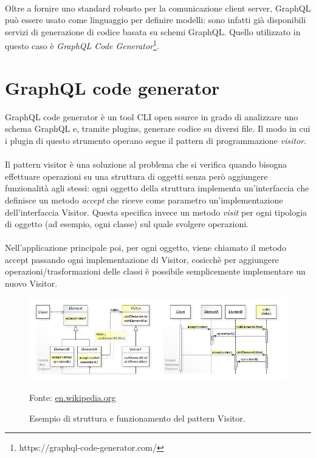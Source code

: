 \documentclass[a4paper, 12pt]{report}
\newcommand{\source}[1]{\caption*{Fonte: {#1}}}
\begin{document}
      \paragraph*{}
        Oltre a fornire uno standard robusto per la comunicazione client server, GraphQL può essere usato come linguaggio per definire modelli: sono infatti già disponibili servizi di generazione di codice basata su schemi GraphQL.
        Quello utilizzato in questo caso è \emph{GraphQL Code Generator}\footnote{https://graphql-code-generator.com/}.
      \newpage
    \section{GraphQL code generator}
        GraphQL code generator è un tool CLI open source in grado di analizzare uno schema GraphQL e, tramite plugins, generare codice su diversi file.
        Il modo in cui i plugin di questo strumento operano segue il pattern di programmazione \emph{visitor}.
      \paragraph*{}
        Il pattern visitor è una soluzione al problema che si verifica quando bisogna effettuare operazioni su una struttura di oggetti senza però aggiungere funzionalità agli stessi:
        ogni oggetto della struttura implementa un'interfaccia che definisce un metodo \emph{accept} che riceve come parametro un'implementazione dell'interfaccia Visitor.
        Questa specifica invece un metodo \emph{visit} per ogni tipologia di oggetto (ad esempio, ogni classe) sul quale svolgere operazioni.
      \paragraph*{}
        Nell'applicazione principale poi, per ogni oggetto, viene chiamato il metodo accept passando ogni implementazione di Visitor, cosicchè per aggiungere operazioni/trasformazioni delle classi è possibile semplicemente implementare un nuovo Visitor.
      \begin{figure}[H]
          \includegraphics[width=\textwidth]{visitor-example.jpg}
          \caption{Esempio di struttura e funzionamento del pattern Visitor.}
          \source{\href{https://en.wikipedia.org/wiki/Visitor_pattern}{en.wikipedia.org}}
      \end{figure}
\end{document}
